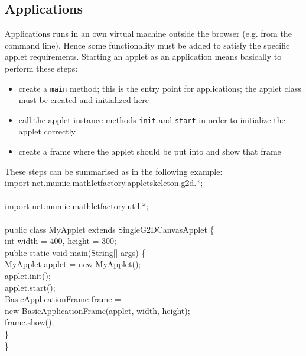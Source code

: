   \subsection{Applications}
  Applications runs in an own virtual machine outside the browser (e.g. from the command line).
  Hence some functionality must be added to satisfy the specific applet requirements.
  Starting an applet as an application means basically to perform these steps:
  \begin{itemize}
  \item create a {\tt main} method; this is the entry point for applications; the applet class
        must be created and initialized here
  \item call the applet instance methods {\tt init} and {\tt start} in order to initialize the 
        applet correctly
  \item create a frame where the applet should be put into and show that frame
  \end{itemize}
  
  These steps can be summarised as in the following example:\\
  {\small\ttfamily
  \indent import net.mumie.mathletfactory.appletskeleton.g2d.*;\\\\
  \indent import net.mumie.mathletfactory.util.*;\\\\
  \indent public class MyApplet extends SingleG2DCanvasApplet \{\\
  \indent\indent int width = 400, height = 300;\\
  \indent\indent public static void main(String[] args) \{\\
  \indent\indent\indent MyApplet applet = new MyApplet();\\
  \indent\indent\indent applet.init();\\
  \indent\indent\indent applet.start();\\
  \indent\indent\indent BasicApplicationFrame frame = \\
  \indent\indent\indent\indent\indent\indent new BasicApplicationFrame(applet, width, height);\\
  \indent\indent\indent frame.show();\\
  \indent\indent\}\\
  \indent\}\\
  }


\begin{appendix}


\end{appendix}